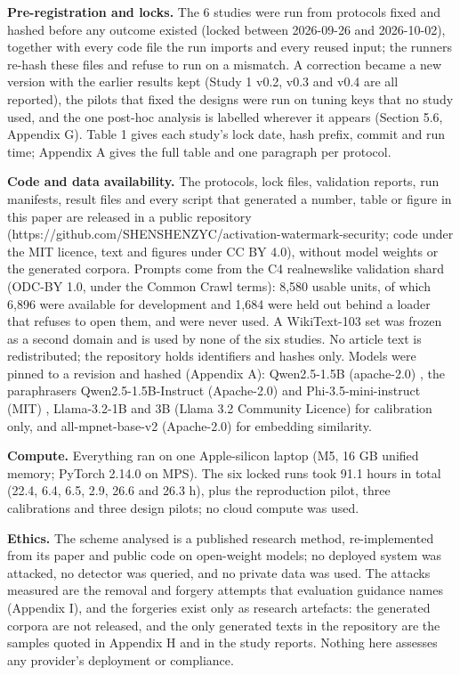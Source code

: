 \documentclass[11pt,letterpaper]{article}
\begin{document}
\textbf{Pre-registration and locks.} The 6 studies were run from protocols fixed and hashed before any outcome existed (locked between 2026-09-26 and 2026-10-02), together with every code file the run imports and every reused input; the runners re-hash these files and refuse to run on a mismatch. A correction became a new version with the earlier results kept (Study 1 v0.2, v0.3 and v0.4 are all reported), the pilots that fixed the designs were run on tuning keys that no study used, and the one post-hoc analysis is labelled wherever it appears (Section 5.6, Appendix G). Table 1 gives each study's lock date, hash prefix, commit and run time; Appendix A gives the full table and one paragraph per protocol.

\textbf{Code and data availability.} The protocols, lock files, validation reports, run manifests, result files and every script that generated a number, table or figure in this paper are released in a public repository (https://github.com/SHENSHENZYC/activation-watermark-security; code under the MIT licence, text and figures under CC BY 4.0), without model weights or the generated corpora. Prompts come from the C4 realnewslike validation shard \citep{raffel2020t5} (ODC-BY 1.0, under the Common Crawl terms): 8,580 usable units, of which 6,896 were available for development and 1,684 were held out behind a loader that refuses to open them, and were never used. A WikiText-103 set \citep{merity2017pointer} was frozen as a second domain and is used by none of the six studies. No article text is redistributed; the repository holds identifiers and hashes only. Models were pinned to a revision and hashed (Appendix A): Qwen2.5-1.5B (apache-2.0) \citep{qwen2024qwen25, qwen2024card15b}, the paraphrasers Qwen2.5-1.5B-Instruct (Apache-2.0) \citep{qwen2024card15binstruct} and Phi-3.5-mini-instruct (MIT) \citep{abdin2024phi3}, Llama-3.2-1B and 3B (Llama 3.2 Community Licence) \citep{grattafiori2024llama3} for calibration only, and all-mpnet-base-v2 (Apache-2.0) \citep{reimers2019sbert} for embedding similarity.

\textbf{Compute.} Everything ran on one Apple-silicon laptop (M5, 16 GB unified memory; PyTorch 2.14.0 on MPS). The six locked runs took 91.1 hours in total (22.4, 6.4, 6.5, 2.9, 26.6 and 26.3 h), plus the reproduction pilot, three calibrations and three design pilots; no cloud compute was used.

\textbf{Ethics.} The scheme analysed is a published research method, re-implemented from its paper and public code on open-weight models; no deployed system was attacked, no detector was queried, and no private data was used. The attacks measured are the removal and forgery attempts that evaluation guidance names (Appendix I), and the forgeries exist only as research artefacts: the generated corpora are not released, and the only generated texts in the repository are the samples quoted in Appendix H and in the study reports. Nothing here assesses any provider's deployment or compliance.
\end{document}
